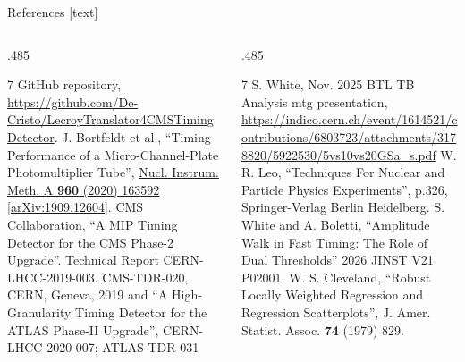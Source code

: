 \begin{frame}[t]{References}
\fontsize{7.5}{8.8}\selectfont
\setlength{\parskip}{0pt}
[text]
\begin{columns}[T,onlytextwidth]
\begin{column}{.485\textwidth}
\begin{thebibliography}{7}
\setlength{\itemsep}{3pt}
GitHub repository,
\url{https://github.com/De-Cristo/LecroyTranslator4CMSTimingDetector}.
J. Bortfeldt et al., ``Timing Performance of a Micro-Channel-Plate Photomultiplier Tube'',
\href{https://doi.org/10.1016/j.nima.2020.163592}{Nucl. Instrum. Meth. A \textbf{960} (2020) 163592}
[\href{https://arxiv.org/abs/1909.12604}{arXiv:1909.12604}].
CMS Collaboration, ``A MIP Timing Detector for the CMS Phase-2 Upgrade''.
Technical Report CERN-LHCC-2019-003. CMS-TDR-020, CERN, Geneva, 2019 and
``A High-Granularity Timing Detector for the ATLAS Phase-II Upgrade'',
CERN-LHCC-2020-007; ATLAS-TDR-031
\end{thebibliography}
\end{column}
\begin{column}{.485\textwidth}
\begin{thebibliography}{7}
\setlength{\itemsep}{3pt}
S. White, Nov. 2025 BTL TB Analysis mtg presentation,
\url{https://indico.cern.ch/event/1614521/contributions/6803723/attachments/3178820/5922530/5vs10vs20GSa_s.pdf}
W. R. Leo, ``Techniques For Nuclear and Particle Physics Experiments'',
p.326, Springer-Verlag Berlin Heidelberg.
S. White and A. Boletti, ``Amplitude Walk in Fast Timing: The Role of Dual Thresholds''
2026 JINST V21 P02001.
W. S. Cleveland, ``Robust Locally Weighted Regression and Regression Scatterplots'',
J. Amer. Statist. Assoc. \textbf{74} (1979) 829.
\end{thebibliography}
\end{column}
\end{columns}
\end{frame}
